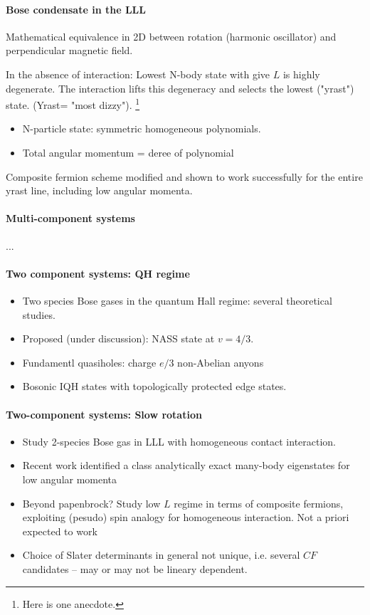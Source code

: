\documentclass{article}
\numberwithin{equation}{subsection} %
\theoremstyle{definition}
\begin{document}
\paragraph{Bose condensate in the LLL}
Mathematical equivalence in 2D between rotation (harmonic oscillator) and
perpendicular magnetic field.

In the absence of interaction: Lowest N-body state with give $L$ is highly
degenerate. The interaction lifts this degeneracy and selects the lowest
("yrast") state. (Yrast= "most dizzy"). \footnote{Here is one anecdote.}

\begin{itemize}
    \item N-particle state: symmetric homogeneous polynomials.
    \item Total angular momentum = deree of polynomial
\end{itemize}

Composite fermion scheme modified and shown to work successfully for the
entire yrast line, including low angular momenta.

\paragraph{Multi-component systems} ...
\paragraph{Two component systems: QH regime}
\begin{itemize}
    \item Two species Bose gases in the quantum Hall regime: several
        theoretical studies.
    \item Proposed (under discussion): NASS state at $v=4/3$.
    \item Fundamentl quasiholes: charge $e/3$ non-Abelian anyons
    \item Bosonic IQH states with topologically protected edge states.
\end{itemize}

\paragraph{Two-component systems: Slow rotation}
\begin{itemize}
    \item Study 2-species Bose gas in LLL with homogeneous contact
        interaction.
    \item Recent work identified a class analytically exact many-body
        eigenstates for low angular momenta
    \item Beyond papenbrock? Study low $L$ regime in terms of composite
        fermions, exploiting (pesudo) spin analogy for homogeneous
        interaction. Not a priori expected to work
    \item Choice of Slater determinants in general not unique, i.e.
        several $CF$ candidates -- may or may not be lineary dependent.
\end{itemize}
\end{document}
